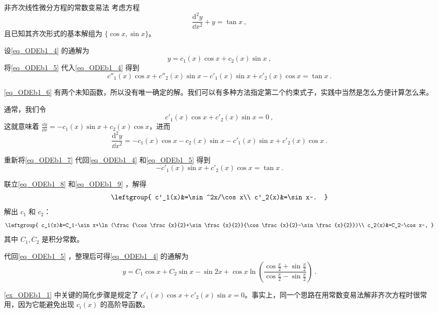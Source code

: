 \begin{example}{非齐次线性微分方程的常数变易法}\label{ex_ODEb1_1}
考虑方程
\begin{equation}\label{eq_ODEb1_4}
\frac{\mathrm{d}^2 y}{\dd x^2}+y=\tan x~,
\end{equation}
且已知其齐次形式的基本解组为 $\{\cos x, \sin x\}$。

设\autoref{eq_ODEb1_4} 的通解为
\begin{equation}\label{eq_ODEb1_5}
y=c_1(x)\cos x+c_2(x)\sin x~,
\end{equation}
将\autoref{eq_ODEb1_5} 代入\autoref{eq_ODEb1_4} 得到
\begin{equation}\label{eq_ODEb1_6}
c''_1(x)\cos x+c''_2(x)\sin x-c'_1(x)\sin x+c'_2(x)\cos x=\tan x~.
\end{equation}

\autoref{eq_ODEb1_6} 有两个未知函数，所以没有唯一确定的解。我们可以有多种方法指定第二个约束式子，实践中当然是怎么方便计算怎么来。

通常，我们令
\begin{equation}\label{eq_ODEb1_8}
c'_1(x)\cos x+c'_2(x)\sin x=0~,
\end{equation}
这就意味着 $\frac{\dd y}{\dd x}=-c_1(x)\sin x+c_2(x)\cos x$，进而
\begin{equation}\label{eq_ODEb1_7}
\frac{\mathrm{d}^2 y}{\dd x^2}=-c_1(x)\cos x-c_2(x)\sin x-c'_1(x)\sin x+c'_2(x)\cos x~.
\end{equation}

重新将\autoref{eq_ODEb1_7} 代回\autoref{eq_ODEb1_4} 和\autoref{eq_ODEb1_5} 得到
\begin{equation}\label{eq_ODEb1_9}
-c'_1(x)\sin x+c'_2(x)\cos x=\tan x~.
\end{equation}

联立\autoref{eq_ODEb1_8} 和\autoref{eq_ODEb1_9} ，解得
\begin{equation}
\leftgroup{
c'_1(x)&=\sin^2x/\cos x\\
c'_2(x)&=\sin x~.
}
\end{equation}
解出 $c_1$ 和 $c_2$：
\begin{equation}
\leftgroup{
    c_1(x)&=C_1-\sin x+\ln(\frac{\cos\frac{x}{2}+\sin\frac{x}{2}}{\cos\frac{x}{2}-\sin\frac{x}{2}})\\
    c_2(x)&=C_2-\cos x~,
}
\end{equation}
其中 $C_1, C_2$ 是积分常数。

代回\autoref{eq_ODEb1_5} ，整理后可得\autoref{eq_ODEb1_4} 的通解为
\begin{equation}
y=C_1\cos x+C_2\sin x-\sin 2x+\cos x\ln(\frac{\cos\frac{x}{2}+\sin\frac{x}{2}}{\cos\frac{x}{2}-\sin\frac{x}{2}})~.
\end{equation}




\end{example}


\autoref{ex_ODEb1_1} 中关键的简化步骤是规定了 $c'_1(x)\cos x+c'_2(x)\sin x=0$。事实上，同一个思路在用常数变易法解非齐次方程时很常用，因为它能避免出现 $c_i(x)$ 的高阶导函数。
















